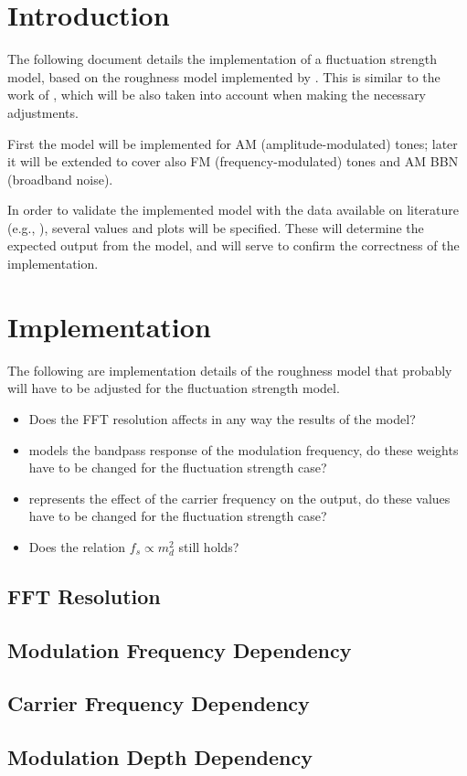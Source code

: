 \documentclass[a4paper]{article}
\begin{document}

\section{Introduction}

The following document details the implementation of a fluctuation strength
model, based on the roughness model implemented by \citet{Schrader2002}.
This is similar to the work of \citet{Sontacchi1998}, which will be also
taken into account when making the necessary adjustments.

First the model will be implemented for AM (amplitude-modulated) tones; later it
will be extended to cover also FM (frequency-modulated) tones and AM BBN
(broadband noise).

In order to validate the implemented model with the data available on literature
(e.g., \citet{Fastl2007Psychoacoustics}), several values and plots will be
specified. These will determine the expected output from the model, and will
serve to confirm the correctness of the implementation.

\section{Implementation}

The following are implementation details of the roughness model that probably
will have to be adjusted for the fluctuation strength model.

\begin{itemize}
    \item Does the FFT resolution affects in any way the results of the model?
    \item {} models the bandpass response of the modulation
        frequency, do these weights have to be changed for the fluctuation
        strength case?
    \item {} represents the effect of the carrier frequency on
        the output, do these values have to be changed for the fluctuation
        strength case?
    \item Does the relation $f_s \propto m_d ^ 2$ still holds?
\end{itemize}

\subsection{FFT Resolution}

\subsection{Modulation Frequency Dependency}

\subsection{Carrier Frequency Dependency}

\subsection{Modulation Depth Dependency}



\end{document}
